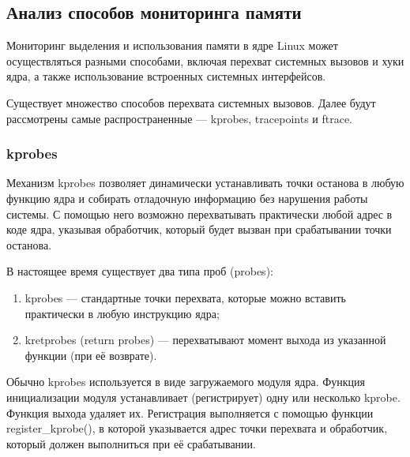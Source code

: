 \newpage

\subsection{Анализ способов мониторинга памяти}

Мониторинг выделения и использования памяти в ядре Linux может осуществляться разными способами, включая перехват системных вызовов и хуки ядра, а также использование встроенных системных интерфейсов.


Существует множество способов перехвата системных вызовов.
Далее будут рассмотрены самые распространенные --- kprobes, tracepoints и ftrace.

\subsubsection*{kprobes}

Механизм kprobes позволяет динамически устанавливать точки останова в любую функцию ядра и собирать отладочную информацию без нарушения работы системы.
С помощью него возможно перехватывать практически любой адрес в коде ядра, указывая обработчик, который будет вызван при срабатывании точки останова.~\cite{kprobe}

В настоящее время существует два типа проб (probes):
\begin{enumerate}
    \item kprobes --- стандартные точки перехвата, которые можно вставить практически в любую инструкцию ядра;
    \item kretprobes (return probes) --- перехватывают момент выхода из указанной функции (при её возврате).
\end{enumerate}

Обычно kprobes используется в виде загружаемого модуля ядра.
Функция инициализации модуля устанавливает (регистрирует) одну или несколько kprobe.
Функция выхода удаляет их.
Регистрация выполняется с помощью функции register\_kprobe(), в которой указывается адрес точки перехвата и обработчик, который должен выполниться при её срабатывании.~\cite{kprobe}


